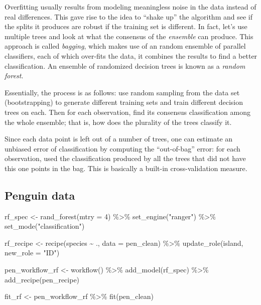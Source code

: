 \documentclass[
  letterpaper,
  DIV=11,
  numbers=noendperiod]{scrreprt}
\newenvironment{Shaded}{\begin{snugshade}}{\end{snugshade}}
\newcommand{\AttributeTok}[1]{\textcolor[rgb]{0.40,0.45,0.13}{#1}}
\newcommand{\DecValTok}[1]{\textcolor[rgb]{0.68,0.00,0.00}{#1}}
\newcommand{\FunctionTok}[1]{\textcolor[rgb]{0.28,0.35,0.67}{#1}}
\newcommand{\NormalTok}[1]{\textcolor[rgb]{0.00,0.23,0.31}{#1}}
\newcommand{\OtherTok}[1]{\textcolor[rgb]{0.00,0.23,0.31}{#1}}
\newcommand{\SpecialCharTok}[1]{\textcolor[rgb]{0.37,0.37,0.37}{#1}}
\newcommand{\StringTok}[1]{\textcolor[rgb]{0.13,0.47,0.30}{#1}}
\begin{document}
Overfitting usually results from modeling meaningless noise in the data
instead of real differences. This gave rise to the idea to ``shake up''
the algorithm and see if the splits it produces are robust if the
training set is different. In fact, let's use multiple trees and look at
what the consensus of the \emph{ensemble} can produce. This approach is
called \emph{bagging}, which makes use of an random ensemble of parallel
classifiers, each of which over-fits the data, it combines the results
to find a better classification. An ensemble of randomized decision
trees is known as a \emph{random forest}.

Essentially, the process is as follows: use random sampling from the
data set (bootstrapping) to generate different training sets and train
different decision trees on each. Then for each observation, find its
consensus classification among the whole ensemble; that is, how does the
plurality of the trees classify it.

Since each data point is left out of a number of trees, one can estimate
an unbiased error of classification by computing the ``out-of-bag''
error: for each observation, used the classification produced by all the
trees that did not have this one points in the bag. This is basically a
built-in cross-validation measure.

\hypertarget{penguin-data-2}{%
\subsection{Penguin data}\label{penguin-data-2}}

\begin{Shaded}
\begin{Highlighting}[]
\NormalTok{rf\_spec }\OtherTok{\textless{}{-}} \FunctionTok{rand\_forest}\NormalTok{(}\AttributeTok{mtry =} \DecValTok{4}\NormalTok{) }\SpecialCharTok{\%\textgreater{}\%}
  \FunctionTok{set\_engine}\NormalTok{(}\StringTok{"ranger"}\NormalTok{) }\SpecialCharTok{\%\textgreater{}\%}
  \FunctionTok{set\_mode}\NormalTok{(}\StringTok{"classification"}\NormalTok{)}
\end{Highlighting}
\end{Shaded}

\begin{Shaded}
\begin{Highlighting}[]
\NormalTok{rf\_recipe }\OtherTok{\textless{}{-}} 
  \FunctionTok{recipe}\NormalTok{(species }\SpecialCharTok{\textasciitilde{}}\NormalTok{ ., }\AttributeTok{data =}\NormalTok{ pen\_clean) }\SpecialCharTok{\%\textgreater{}\%} 
  \FunctionTok{update\_role}\NormalTok{(island,  }\AttributeTok{new\_role =} \StringTok{"ID"}\NormalTok{)}

\NormalTok{pen\_workflow\_rf }\OtherTok{\textless{}{-}} \FunctionTok{workflow}\NormalTok{() }\SpecialCharTok{\%\textgreater{}\%}
  \FunctionTok{add\_model}\NormalTok{(rf\_spec) }\SpecialCharTok{\%\textgreater{}\%}
  \FunctionTok{add\_recipe}\NormalTok{(pen\_recipe)}

\NormalTok{fit\_rf }\OtherTok{\textless{}{-}}\NormalTok{ pen\_workflow\_rf }\SpecialCharTok{\%\textgreater{}\%} \FunctionTok{fit}\NormalTok{(pen\_clean)}
\end{Highlighting}
\end{Shaded}
\end{document}
